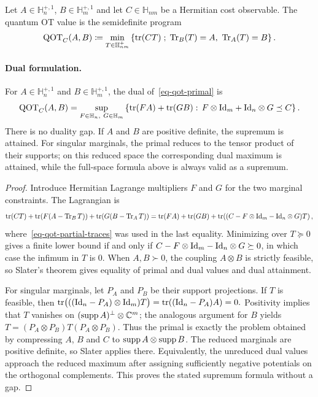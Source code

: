 \begin{defn}\label{def-finite-dimensional-qot}
Let $A\in\mathbb H_n^{+,1}$, $B\in\mathbb H_m^{+,1}$ and let $C\in\mathbb H_{nm}$ be a Hermitian cost observable. The quantum OT value is the semidefinite program
\begin{equation}\label{eq-qot-primal}
\mathrm{QOT}_C(A,B)
\eqdef
\min_{T\in\mathbb H_{nm}^+}
\enscond{\tr(CT)}{\operatorname{Tr}_B(T)=A,\ \operatorname{Tr}_A(T)=B}.
\end{equation}
\end{defn}
\paragraph{Dual formulation.}
\begin{prop}\label{prop-qot-duality}
For $A\in\mathbb H_n^{+,1}$ and $B\in\mathbb H_m^{+,1}$, the dual of~\eqref{eq-qot-primal} is
\begin{equation}\label{eq-qot-dual}
\mathrm{QOT}_C(A,B)
=
\sup_{F\in\mathbb H_n,\ G\in\mathbb H_m}
\left\{
\operatorname{tr}(FA)+\operatorname{tr}(GB)
:\,
F\otimes\mathrm{Id}_m+\mathrm{Id}_n\otimes G\preceq C
\right\}.
\end{equation}
There is no duality gap. If $A$ and $B$ are positive definite, the supremum is attained. For singular marginals, the primal reduces to the tensor product of their supports; on this reduced space the corresponding dual maximum is attained, while the full-space formula above is always valid as a supremum.
\end{prop}
\begin{proof}
Introduce Hermitian Lagrange multipliers $F$ and $G$ for the two marginal constraints. The Lagrangian is
\[
\operatorname{tr}(CT)+\operatorname{tr}\!\left(F(A-\operatorname{Tr}_B T)\right)
+\operatorname{tr}\!\left(G(B-\operatorname{Tr}_A T)\right)
=
\operatorname{tr}(FA)+\operatorname{tr}(GB)
+\operatorname{tr}\!\left((C-F\otimes\mathrm{Id}_m-\mathrm{Id}_n\otimes G)T\right),
\]
where~\eqref{eq-qot-partial-traces} was used in the last equality. Minimizing over $T\succeq0$ gives a finite lower bound if and only if $C-F\otimes\mathrm{Id}_m-\mathrm{Id}_n\otimes G\succeq0$, in which case the infimum in $T$ is $0$. When $A,B\succ0$, the coupling $A\otimes B$ is strictly feasible, so Slater's theorem gives equality of primal and dual values and dual attainment.

For singular marginals, let $P_A$ and $P_B$ be their support projections. If $T$ is feasible, then
\(\operatorname{tr}\bigl(((\mathrm{Id}_n-P_A)\otimes\mathrm{Id}_m)T\bigr) = \operatorname{tr}((\mathrm{Id}_n-P_A)A)=0.\)
Positivity implies that $T$ vanishes on $(\operatorname{supp} A)^\perp\otimes\mathbb{C}^m$; the analogous argument for $B$ yields
\(T=(P_A\otimes P_B)T(P_A\otimes P_B)\).
Thus the primal is exactly the problem obtained by compressing $A$, $B$ and $C$ to $\operatorname{supp} A\otimes\operatorname{supp} B$. The reduced marginals are positive definite, so Slater applies there. Equivalently, the unreduced dual values approach the reduced maximum after assigning sufficiently negative potentials on the orthogonal complements. This proves the stated supremum formula without a gap.
\end{proof}
